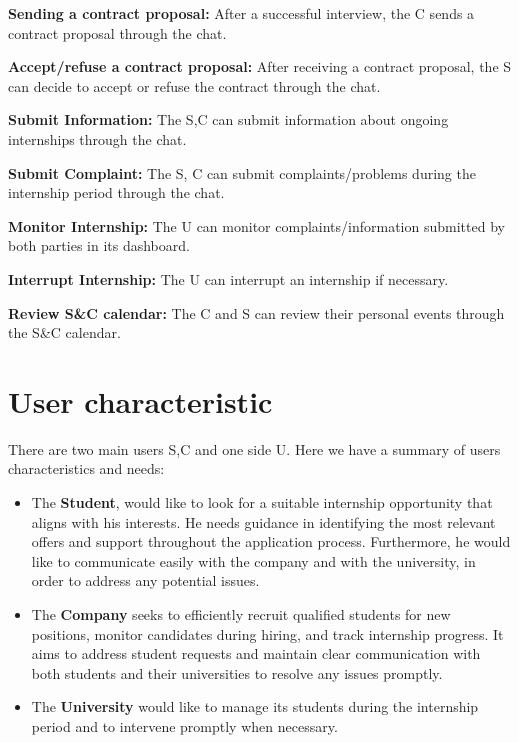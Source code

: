 \textbf{Sending a contract proposal:} After a successful interview, the C
sends a contract proposal through the chat.

\textbf{Accept/refuse a contract proposal:} After receiving a contract
proposal, the S can decide to accept or refuse the contract through the
chat.

\textbf{Submit Information:} The S,C can submit information about
ongoing internships through the chat.

\textbf{Submit Complaint:} The S, C can submit
complaints/problems during the internship period through the chat.

\textbf{Monitor Internship:} The U can monitor
complaints/information submitted by both parties in its
dashboard.

\textbf{Interrupt Internship:} The U can interrupt an internship if
necessary.

\textbf{Review S\&C calendar:} The C and S can review their personal
events through the S\&C calendar.


\section{User characteristic}
\label{sec:User_characteristic}%

There are two main users S,C and one side U.
Here we have a summary of users characteristics and needs:

\begin{itemize}
\item
  The \textbf{Student}, would like to look for a suitable
  internship opportunity that aligns with his interests. He needs
  guidance in identifying the most relevant offers and support
  throughout the application process. Furthermore, he would like to 
  communicate easily with the company and with the university, 
  in order to address any potential issues.
\end{itemize}

\begin{itemize}
\item
  The \textbf{Company} seeks to efficiently recruit qualified students for new positions, monitor candidates during hiring, and track internship progress. It aims to address student requests and maintain clear communication with both students and their universities to resolve any issues promptly.
\end{itemize}

\begin{itemize}
\item
  The \textbf{University} would like to manage its students during the internship
  period and to intervene promptly when necessary.
\end{itemize}



